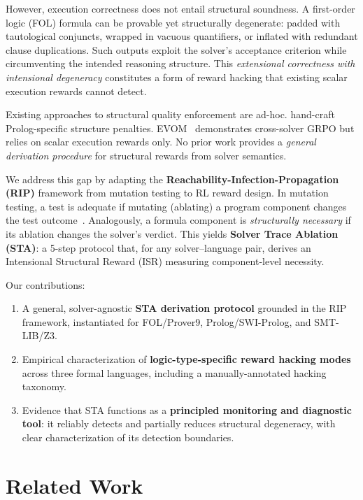\documentclass[11pt,a4paper]{article}
\begin{document}
However, execution correctness does not entail structural soundness.
A first-order logic (FOL) formula can be provable yet structurally degenerate: padded with tautological conjuncts, wrapped in vacuous quantifiers, or inflated with redundant clause duplications.
Such outputs exploit the solver's acceptance criterion while circumventing the intended reasoning structure.
This \emph{extensional correctness with intensional degeneracy} constitutes a form of reward hacking that existing scalar execution rewards cannot detect.

Existing approaches to structural quality enforcement are ad-hoc.
\citet{mellgren2025prolog} hand-craft Prolog-specific structure penalties.
EVOM~\cite{wang2026evom} demonstrates cross-solver GRPO but relies on scalar execution rewards only.
No prior work provides a \emph{general derivation procedure} for structural rewards from solver semantics.

We address this gap by adapting the \textbf{Reachability-Infection-Propagation (RIP)} framework from mutation testing to RL reward design.
In mutation testing, a test is adequate if mutating (ablating) a program component changes the test outcome~\cite{jia2011mutation}.
Analogously, a formula component is \emph{structurally necessary} if its ablation changes the solver's verdict.
This yields \textbf{Solver Trace Ablation (STA)}: a 5-step protocol that, for any solver--language pair, derives an Intensional Structural Reward (ISR) measuring component-level necessity.

Our contributions:
\begin{enumerate}[nosep]
  \item A general, solver-agnostic \textbf{STA derivation protocol} grounded in the RIP framework, instantiated for FOL/Prover9, Prolog/SWI-Prolog, and SMT-LIB/Z3.
  \item Empirical characterization of \textbf{logic-type-specific reward hacking modes} across three formal languages, including a manually-annotated hacking taxonomy.
  \item Evidence that STA functions as a \textbf{principled monitoring and diagnostic tool}: it reliably detects and partially reduces structural degeneracy, with clear characterization of its detection boundaries.
\end{enumerate}

\section{Related Work}
\end{document}
